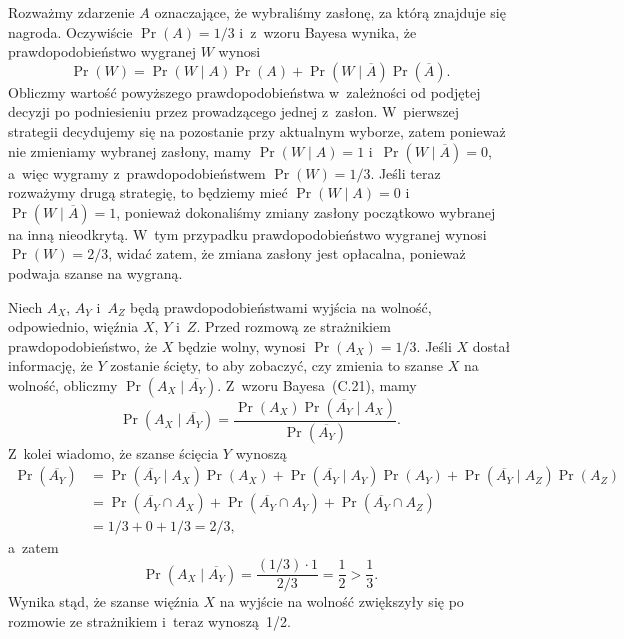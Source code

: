 \exercise{} %
Rozważmy zdarzenie $A$ oznaczające, że wybraliśmy zasłonę, za którą znajduje się nagroda. Oczywiście $\Pr(A)=1/3$ i~z~wzoru Bayesa wynika, że prawdopodobieństwo wygranej $W$ wynosi
\[
	\Pr(W) = \Pr(W\mid A)\Pr(A)+\Pr(W\mid\overline{A})\Pr(\overline{A}).
\]
Obliczmy wartość powyższego prawdopodobieństwa w~zależności od podjętej decyzji po podniesieniu przez prowadzącego jednej z~zasłon. W~pierwszej strategii decydujemy się na pozostanie przy aktualnym wyborze, zatem ponieważ nie zmieniamy wybranej zasłony, mamy $\Pr(W\mid A)=1$ i~$\Pr(W\mid\overline{A})=0$, a~więc wygramy z~prawdopodobieństwem $\Pr(W)=1/3$. Jeśli teraz rozważymy drugą strategię, to będziemy mieć $\Pr(W\mid A)=0$ i~$\Pr(W\mid\overline{A})=1$, ponieważ dokonaliśmy zmiany zasłony początkowo wybranej na inną nieodkrytą. W~tym przypadku prawdopodobieństwo wygranej wynosi $\Pr(W)=2/3$, widać zatem, że zmiana zasłony jest opłacalna, ponieważ podwaja szanse na wygraną.

\exercise{} %
Niech $A_X$, $A_Y$ i~$A_Z$ będą prawdopodobieństwami wyjścia na wolność, odpowiednio, więźnia $X$, $Y$ i~$Z$. Przed rozmową ze strażnikiem prawdopodobieństwo, że $X$ będzie wolny, wynosi $\Pr(A_X)=1/3$. Jeśli $X$ dostał informację, że $Y$ zostanie ścięty, to aby zobaczyć, czy zmienia to szanse $X$ na wolność, obliczmy $\Pr(A_X\mid\overline{A_Y})$. Z~wzoru Bayesa~(C.21), mamy
\[
	\Pr(A_X\mid\overline{A_Y}) = \frac{\Pr(A_X)\Pr(\overline{A_Y}\mid A_X)}{\Pr(\overline{A_Y})}.
\]
Z~kolei wiadomo, że szanse ścięcia $Y$ wynoszą
\begin{align*}
	\Pr(\overline{A_Y}) &= \Pr(\overline{A_Y}\mid A_X)\Pr(A_X)+\Pr(\overline{A_Y}\mid A_Y)\Pr(A_Y)+\Pr(\overline{A_Y}\mid A_Z)\Pr(A_Z) \\
	&= \Pr(\overline{A_Y}\cap A_X)+\Pr(\overline{A_Y}\cap A_Y)+\Pr(\overline{A_Y}\cap A_Z) \\
	&= 1/3+0+1/3 = 2/3,
\end{align*}
a~zatem
\[
	\Pr(A_X\mid\overline{A_Y}) = \frac{(1/3)\cdot1}{2/3} = \frac{1}{2}>\frac{1}{3}.
\]
Wynika stąd, że szanse więźnia $X$ na wyjście na wolność zwiększyły się po rozmowie ze strażnikiem i~teraz wynoszą~1/2.


